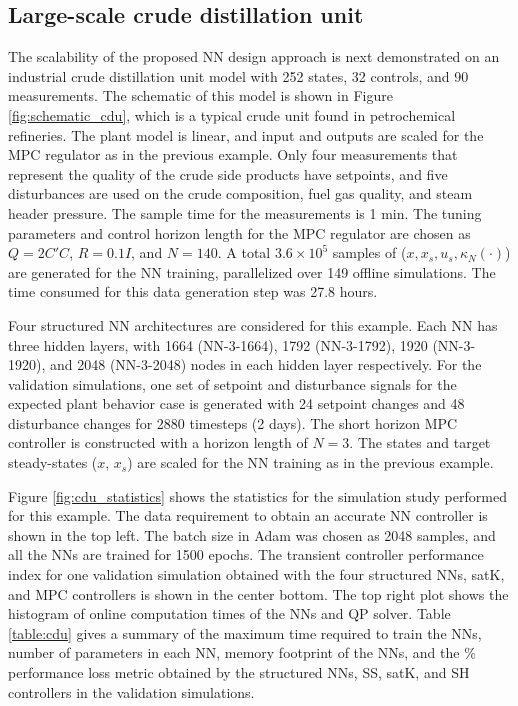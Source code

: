 \documentclass[preprint,5p, twocolumn, authoryear]{elsarticle}
\begin{document}
\subsection{Large-scale crude distillation unit}

The scalability of the proposed NN design 
approach is next demonstrated on an industrial crude 
distillation unit model \citep*{pannocchia:rawlings:wright:2007} 
with 252 states, 32 controls, and 90 measurements. The 
schematic of this model is shown in Figure \ref{fig:schematic_cdu}, 
which is a typical crude unit found in petrochemical refineries.
The plant model is linear, and input and outputs are scaled 
for the MPC regulator as in the previous example.
Only four measurements that represent 
the quality of the crude side products have setpoints, 
and five disturbances are used on the crude composition, 
fuel gas quality, and steam header pressure. 
The sample time for the measurements is 1 min. The tuning 
parameters and control horizon length for the 
MPC regulator are chosen as $Q = 2C'C$, $R = 0.1I$, 
and $N = 140$. A total $3.6 \times 10^5$ 
samples of ($x, x_s, u_s, \kappa_N(\cdot)$)
are generated for the NN training, parallelized over 
149 offline simulations. The time consumed 
for this data generation step was 
27.8 hours.

Four structured NN architectures 
are considered for this example. Each NN
has three hidden layers, with 
1664 (NN-3-1664), 1792 (NN-3-1792), 
1920 (NN-3-1920), and 2048 (NN-3-2048) 
nodes in each hidden layer respectively. 
For the validation simulations, one set of
setpoint and disturbance signals for the expected 
plant behavior case is generated
with 24 setpoint changes and 48 disturbance changes 
for 2880 timesteps (2 days). 
The short horizon MPC controller is constructed with a 
horizon length of $N = 3$. 
The states and target steady-states 
($x$, $x_s$) are scaled for the NN training
as in the previous example. 

Figure \ref{fig:cdu_statistics} shows the 
statistics for the simulation study performed for this 
example.
The data requirement to obtain 
an accurate NN controller is shown in the top left.
The batch size 
in Adam was chosen as 2048 samples, and all the NNs 
are trained for 1500 epochs.
The transient controller performance index 
for one validation simulation
obtained with the four structured NNs,
satK, and MPC controllers is shown in the center bottom.
The top right plot shows the 
histogram of online computation times 
of the NNs and QP solver.
Table \ref{table:cdu} gives a summary of 
the maximum time required to train the NNs, number of parameters
in each NN, memory footprint of the NNs, and 
the $\%$ performance loss metric obtained by 
the structured NNs, SS, satK, and SH 
controllers in the validation simulations. 
\end{document}
